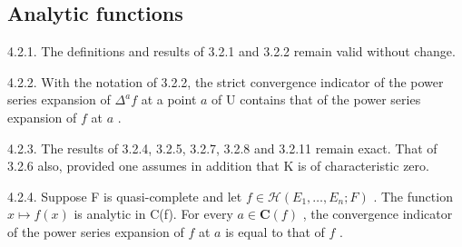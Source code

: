 \subsection{Analytic functions}

4.2.1. The definitions and results of 3.2.1 and 3.2.2 remain valid without change.

4.2.2. With the notation of 3.2.2, the strict convergence indicator of the power series expansion of \(\Delta^{a}f\) at a point \(a\) of U contains that of the power series expansion of \(f\) at \(a\) .

4.2.3. The results of 3.2.4, 3.2.5, 3.2.7, 3.2.8 and 3.2.11 remain exact. That of 3.2.6 also, provided one assumes in addition that K is of characteristic zero.



4.2.4. Suppose F is quasi-complete and let \(f\in\mathcal{H}(E_{1},\ldots,E_{n};F)\) . The function \(x\mapsto f(x)\) is analytic in C(f). For every \(a\in\mathbf{C}(f)\) , the convergence indicator of the power series expansion of \(f\) at \(a\) is equal to that of \(f\) .

